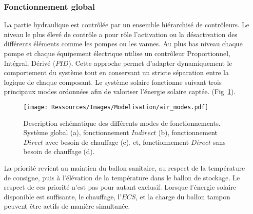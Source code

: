\subsubsection{Fonctionnement global} %
\label{ssub:fonctionnement_global}
La partie hydraulique est contrôlée par un ensemble hiérarchisé de contrôleurs. Le niveau
le plus élevé de contrôle a pour rôle l’activation ou la désactivation des différents
éléments comme les pompes ou les vannes. Au plus bas niveau chaque pompe et chaque
équipement électrique utilise un contrôleur Proportionnel, Intégral, Dérivé ($PID$). Cette
approche permet d’adapter dynamiquement le comportement du système tout en conservant un
stricte séparation entre la logique de chaque composant. Le système solaire fonctionne
suivant trois principaux modes ordonnées afin de valoriser l’énergie solaire captée.
(Fig~\ref{fig:schema_modes}).
\begin{figure}
    \begin{center}
        \texttt{[image: Ressources/Images/Modelisation/air\_modes.pdf]}
    \end{center}
    \caption{Description schématique des différents modes de fonctionnements. Système
    global (a), fonctionnement $Indirect$ (b), fonctionnement $Direct$ avec besoin de
    chauffage (c), et, fonctionnement $Direct$ sans besoin de chauffage (d).
             \label{fig:schema_modes}}
\end{figure}

La priorité revient au maintien du ballon sanitaire, au respect de la température de
consigne, puis à l’élévation de la température dans le ballon de stockage. Le respect de
ces priorité n’est pas pour autant exclusif. Lorsque l’énergie solaire disponible est
suffisante, le chauffage, l’$ECS$, et la charge du ballon tampon peuvent être actifs de
manière simultanée.

